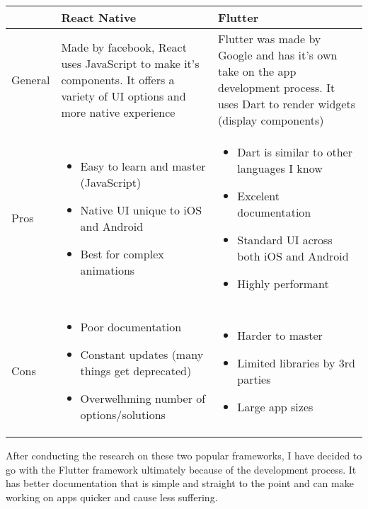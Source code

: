 \documentclass{article}
\begin{document}
\begin{tabular}{| l | p{4.8cm} | p{4.8cm} |}  
\hline  
 & React Native & Flutter \\ \hline
General & Made by facebook, React uses JavaScript to make it's components. It offers a variety of UI options and more native experience & Flutter was made by Google and has it's own take on the app development process. It uses Dart to render widgets (display components) \\ \hline
Pros & 

\begin{itemize}
				\item Easy to learn and master (JavaScript)
				\item Native UI unique to iOS and Android
				\item Best for complex animations
\end{itemize}

& 

\begin{itemize}
				\item Dart is similar to other languages I know
				\item Excelent documentation
				\item Standard UI across both iOS and Android
				\item Highly performant
\end{itemize}

\\ \hline
Cons & 

\begin{itemize}
				\item Poor documentation
				\item Constant updates (many things get deprecated)
				\item Overwelhming number of options/solutions
\end{itemize}

& 

\begin{itemize}
				\item Harder to master
				\item Limited libraries by 3rd parties
				\item Large app sizes
\end{itemize}

\\ \hline
\end{tabular}  


After conducting the research on these two popular frameworks, I have decided to go with the Flutter framework ultimately because of the development process. It has better documentation that is simple and straight to the point and can make working on apps quicker and cause less suffering.
\end{document}
